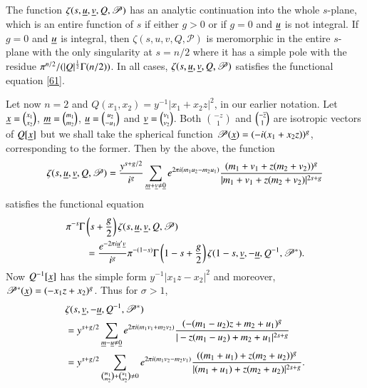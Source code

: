 \begin{thm}\label{chap1:thm3}
The function $\zeta(s,\underline{u},\underline{v},Q,\mathscr{P})$ has an analytic
continuation into the whole $s$-plane, which is an entire function of
$s$ if either $g>0$ or if $g=0$ and $\underline{u}$ is not integral. If $g=0$
and $\underline{u}$ is integral, then $\zeta(s,u,v,Q,\mathscr{P})$ is
meromorphic in the entire $s$-plane with the only singularity at
$s=n/2$ where it has a simple pole with the residue
$\pi^{n/2}/(|Q|^{\frac{1}{2}}\break\Gamma(n/2))$. In all cases,
$\zeta(s,\underline{u},\underline{v},Q,\mathscr{P})$ satisfies the functional
equation \eqref{61}.
\end{thm}

Let now $n=2$ and $Q(x_{1},x_{2})=y^{-1}|x_{1}+x_{2}z|^{2}$, in our
earlier notation. Let $\underline{x}=\binom{x_{1}}{x_{2}}$,
$\underline{m}=\binom{m_{1}}{m_{2}}$, $\underline{u}=\binom{u_{2}}{-u_{1}}$ and
$\underline{v}=\binom{v_{1}}{v_{2}}$. Both $\binom{-z}{1}$ and
$\binom{-\overline{z}}{1}$ are isotropic vectors of $Q[\underline{x}]$ but we shall
take the spherical function
$\mathscr{P}(\underline{x})=(-i(x_{1}+x_{2}z))^{g}$, corresponding to the
former. Then by the above, the function
$$
\zeta(s,\underline{u},\underline{v},Q,\mathscr{P})=\frac{y^{s+g/2}}{i^{g}}\sum_{\underline{m}+\underline{v}\neq
  \underline{0}}e^{2\pi
  i(m_{1}u_{2}-m_{2}u_{1})}\frac{(m_{1}+v_{1}+z(m_{2}+v_{2}))^{g}}{|m_{1}+v_{1}+z(m_{2}+v_{2})|^{2s+g}} 
$$
satisfies the functional equation
\begin{align*}
& \pi^{-s}\Gamma\left(s+\frac{g}{2}\right)\zeta(s,\underline{u},\underline{v},Q,\mathscr{P})\\
&\qquad =\frac{e^{-2\pi
      i\underline{u}'\underline{v}}}{i^{g}}\pi^{-(1-s)}\Gamma\left(1-s+\frac{g}{2}\right)\zeta(1-s,\underline{v},-\underline{u},Q^{-1},\mathscr{P}^{\ast}). 
\end{align*}
Now $Q^{-1}[\underline{x}]$ has the simple form $y^{-1}|x_{1}z-x_{2}|^{2}$
and moreover, $\mathscr{P}^{\ast}(\underline{x})=(-x_{1}z+x_{2})^{g}$. Thus
for $\sigma>1$,
\begin{align*}
& \zeta(s,\underline{v},-\underline{u},Q^{-1},\mathscr{P}^{\ast})\\
& =y^{s+g/2}\sum_{\underline{m}-\underline{u}\neq \underline{0}}e^{2\pi
    i(m_{1}v_{1}+m_{2}v_{2})}\frac{(-(m_{1}-u_{2})z+m_{2}+u_{1})^{g}}{|-z(m_{1}-u_{2})+m_{2}+u_{1}|^{2s+g}}\\
&= y^{s+g/2}\sum_{\binom{m_{1}}{m_{2}}+\binom{u_{1}}{u_{2}}\neq
    0}e^{2\pi
    i(m_{1}v_{2}-m_{2}v_{1})}\frac{((m_{1}+u_{1})+z(m_{2}+u_{2}))^{g}}{|(m_{1}+u_{1})+z(m_{2}+u_{2})|^{2s+g}}. 
\end{align*}

